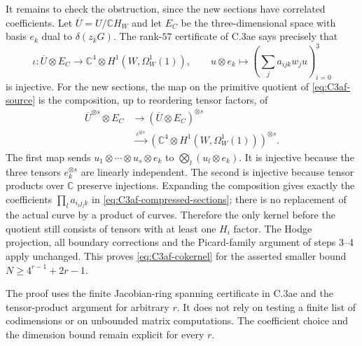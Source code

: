 It remains to check the obstruction, since
the new sections have correlated coefficients.
Let $\overline U=U/\mathbb C H_W$ and let
$E_C$ be the three-dimensional space with
basis $e_k$ dual to $\delta(z_kG)$. The
rank-$57$ certificate of C.3ae says precisely
that
\[
 \iota:\overline U\otimes E_C
       \longrightarrow\mathbb C^4\otimes H^1(W,\Omega_W^1(1)),
 \qquad
 u\otimes e_k\longmapsto
       \left(\sum_j a_{ijk}w_ju\right)_{i=0}^3
\]
is injective. For the new sections, the map
on the primitive quotient of
\eqref{eq:C3af-source} is the composition,
up to reordering tensor factors, of
\[
\begin{split}
 \overline U^{\otimes s}\otimes E_C
   &\longrightarrow(\overline U\otimes E_C)^{\otimes s}\\
   &\xrightarrow{\ \iota^{\otimes s}\ }
       \left(\mathbb C^4\otimes
              H^1(W,\Omega_W^1(1))\right)^{\otimes s}.
\end{split}
\]
The first map sends
$u_1\otimes\cdots\otimes u_s\otimes e_k$
to $\bigotimes_l(u_l\otimes e_k)$. It is
injective because the three tensors
$e_k^{\otimes s}$ are linearly independent.
The second is injective because tensor
products over $\mathbb C$ preserve
injections. Expanding the composition gives
exactly the coefficients
$\prod_l a_{i_lj_lk}$ in
\eqref{eq:C3af-compressed-sections}; there is
no replacement of the actual curve by a
product of curves. Therefore the only
kernel before the quotient still consists
of tensors with at least one $H_i$ factor.
The Hodge projection, all boundary
corrections and the Picard-family argument
of steps 3--4 apply unchanged. This proves
\eqref{eq:C3af-cokernel} for the asserted
smaller bound $N\ge4^{r-1}+2r-1$.

The proof uses the finite Jacobian-ring spanning
certificate in C.3ae and the tensor-product
argument for arbitrary $r$. It does not rely on
testing a finite list of codimensions or on
unbounded matrix computations. The coefficient
choice and the dimension bound remain explicit
for every $r$.

